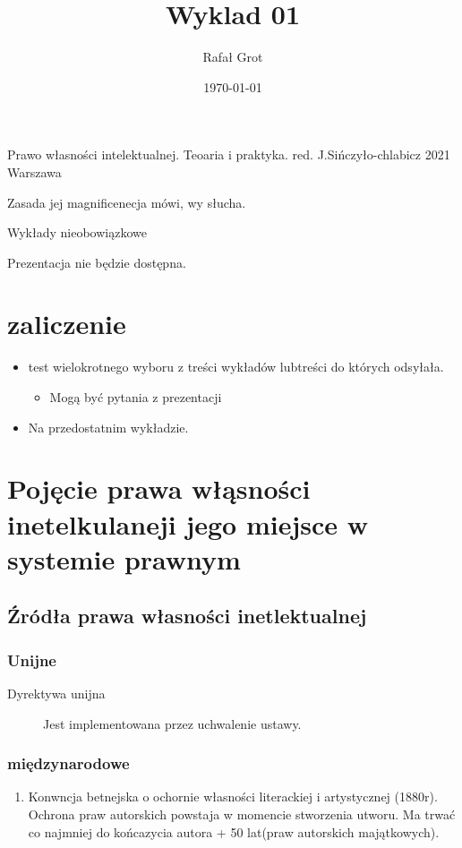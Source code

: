 \documentclass[11pt]{article}
\author{Rafał Grot}
\date{\today}
\title{Wyklad 01}
\begin{document}
\maketitle
\tableofcontents

\begin{description}
\item[{Podręcznik}] Prawo własności intelektualnej. Teoaria i praktyka. red. J.Sińczyło-chlabicz 2021 Warszawa
\item[{Pytania na koniec}] Zasada jej magnificenecja mówi, wy słucha.
\item Wykłady nieobowiązkowe
\item Prezentacja nie będzie dostępna.
\end{description}
\section{zaliczenie}
\label{sec:org36ac8e6}
\begin{itemize}
\item test wielokrotnego wyboru z treści wykładów lubtreści do których odsyłała.
\begin{itemize}
\item Mogą być pytania z prezentacji
\end{itemize}
\item Na przedostatnim wykładzie.
\end{itemize}
\section{Pojęcie prawa włąsności inetelkulaneji jego miejsce w systemie prawnym}
\label{sec:orge2234a4}
\subsection{Źródła prawa własności inetlektualnej}
\label{sec:org85f3f5d}
\subsubsection{Unijne}
\label{sec:org9483e57}
\begin{description}
\item[{Dyrektywa unijna}] Jest implementowana przez uchwalenie ustawy.
\end{description}
\subsubsection{międzynarodowe}
\label{sec:orgfdd1e6f}
\begin{enumerate}
\item Konwncja betnejska o ochornie własności literackiej i artystycznej (1880r).
\label{sec:orgb9968f9}
Ochrona praw autorskich powstaja w momencie stworzenia utworu. Ma trwać co najmniej do końcazycia autora + 50 lat(praw autorskich majątkowych).
\end{enumerate}
\end{document}
